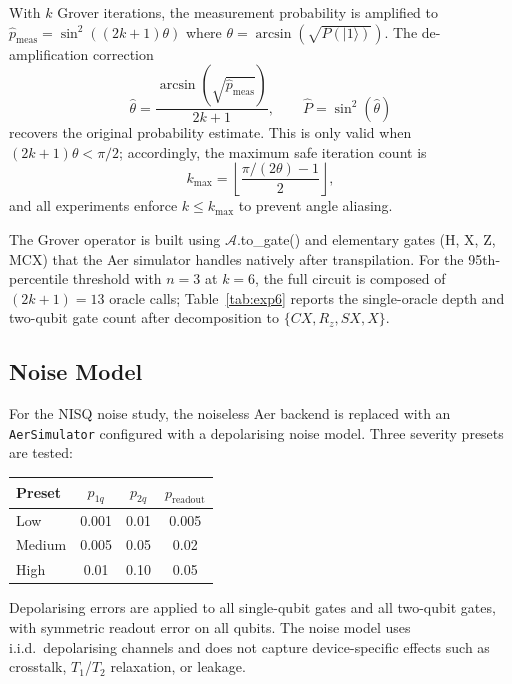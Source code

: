 \documentclass[11pt,a4paper]{article}
\begin{document}
With $k$ Grover iterations, the measurement probability is amplified to $\hat{p}_{\text{meas}} = \sin^2((2k+1)\theta)$ where $\theta = \arcsin(\sqrt{P(|1\rangle)})$. The de-amplification correction
\begin{equation}
\hat{\theta} = \frac{\arcsin(\sqrt{\hat{p}_{\text{meas}}})}{2k+1}, \qquad \hat{P} = \sin^2(\hat{\theta})
\label{eq:deamp}
\end{equation}
recovers the original probability estimate. This is only valid when $(2k+1)\theta < \pi/2$; accordingly, the maximum safe iteration count is
\begin{equation}
k_{\max} = \left\lfloor \frac{\pi/(2\theta) - 1}{2} \right\rfloor,
\label{eq:kmax}
\end{equation}
and all experiments enforce $k \leq k_{\max}$ to prevent angle aliasing.

The Grover operator is built using $\mathcal{A}$.to\_gate() and elementary gates (H, X, Z, MCX) that the Aer simulator handles natively after transpilation. For the 95th-percentile threshold with $n = 3$ at $k = 6$, the full circuit is composed of $(2k + 1) = 13$ oracle calls; Table~\ref{tab:exp6} reports the single-oracle depth and two-qubit gate count after decomposition to $\{CX, R_z, SX, X\}$.

\subsection{Noise Model}

For the NISQ noise study, the noiseless Aer backend is replaced with an \texttt{AerSimulator} configured with a depolarising noise model. Three severity presets are tested:

\medskip
\begin{center}
\begin{tabular}{lccc}
\toprule
Preset & $p_{1q}$ & $p_{2q}$ & $p_{\text{readout}}$ \\
\midrule
Low & 0.001 & 0.01 & 0.005 \\
Medium & 0.005 & 0.05 & 0.02 \\
High & 0.01 & 0.10 & 0.05 \\
\bottomrule
\end{tabular}
\end{center}
\medskip

\noindent Depolarising errors are applied to all single-qubit gates and all two-qubit gates, with symmetric readout error on all qubits. The noise model uses i.i.d.\ depolarising channels and does not capture device-specific effects such as crosstalk, $T_1$/$T_2$ relaxation, or leakage.
\end{document}
